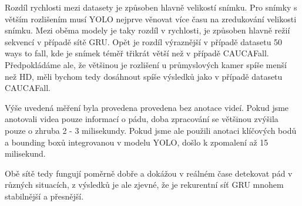 Rozdíl rychlosti mezi datasety je způsoben hlavně velikostí snímku. Pro snímky
s větším rozlišením musí YOLO nejprve věnovat více času na zredukování
velikosti snímku. Mezi oběma modely je taky rozdíl v rychlosti, je způsoben
hlavně režií sekvencí v případě sítě GRU. Opět je rozdíl výraznější v případě
datasetu 50 ways to fall, kde je snímek téměř třikrát větší než v případě
CAUCAFall. Předpokládáme ale, že většinou je rozlišení u průmyslových kamer
spíše menší než HD, měli bychom tedy dosáhnout spíše výsledků jako v případě
datasetu CAUCAFall.

Výše uvedená měření byla provedena provedena bez anotace videí. Pokud jsme
anotovali videa pouze informací o pádu, doba zpracování se většinou zvýšila
pouze o zhruba 2 - 3 milisekundy. Pokud jsme ale použili anotaci klíčových bodů
a bounding boxů integrovanou v modelu YOLO, došlo k zpomalení až 15 milisekund.

Obě sítě tedy fungují poměrně dobře a dokážou v reálném čase detekovat pád v
různých situacích, z výsledků je ale zjevné, že je rekurentní síť GRU mnohem
stabilnější a přesnější.
